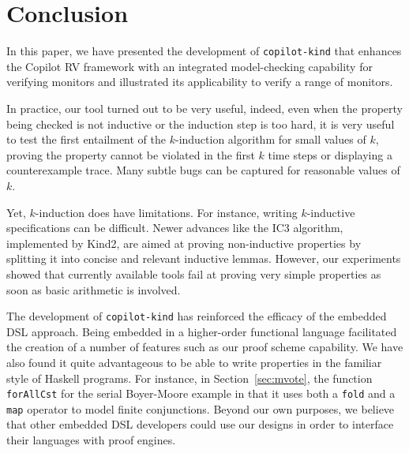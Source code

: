 \section{Conclusion}\label{sec:conclusion}

In this paper, we have presented the development of
\texttt{copilot-kind} that enhances the Copilot RV framework with an
integrated model-checking capability for verifying monitors and
illustrated its applicability to verify a range of monitors.

In practice, our tool turned out to be very useful, indeed, even when
the property being checked is not inductive or the induction step is
too hard, it is very useful to test the first entailment of the
$k$-induction algorithm for small values of $k$, proving the property
cannot be violated in the first $k$ time steps or displaying a
counterexample trace. Many subtle bugs can be captured for reasonable
values of $k$.

Yet, $k$-induction does have limitations. For instance, writing $k$-inductive
specifications can be difficult. Newer advances like the
\textsc{IC}3 algorithm, implemented by Kind2, are aimed at proving
non-inductive properties by splitting it into concise and relevant
inductive lemmas. However, our experiments showed that currently
available tools fail at proving very simple properties as soon as
basic arithmetic is involved.

The development of \texttt{copilot-kind} has reinforced the efficacy
of the embedded DSL approach. Being embedded in a higher-order
functional language facilitated the creation of a number of features
such as our proof scheme capability. We have also found it quite
advantageous to be able to write properties in the familiar style of
Haskell programs. For instance, in Section~\ref{sec:mvote}, the
function \texttt{forAllCst} for the serial Boyer-Moore example in that
it uses both a \texttt{fold} and a \texttt{map} operator to model
finite conjunctions.  Beyond our own purposes, we believe that other
embedded DSL developers could use our designs in order to interface
their languages with proof engines.



